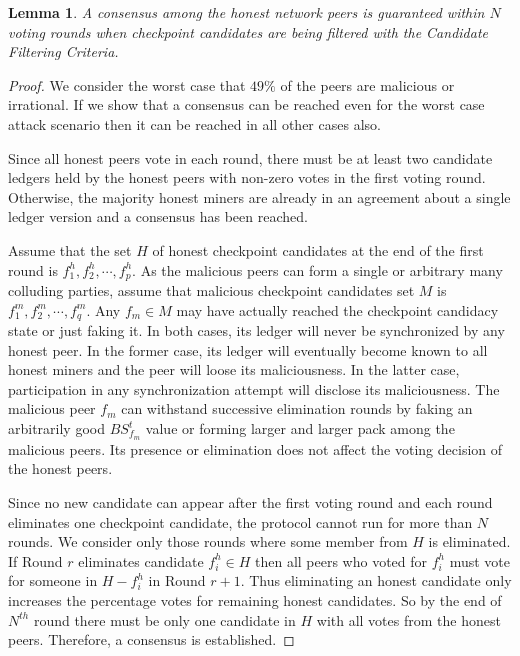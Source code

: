 \documentclass[conference]{IEEEtran}
\newtheorem{lemma}[theorem]{Lemma}
\begin{document}
\begin{lemma}
\label{l-consensus}
A consensus among the honest network peers is guaranteed within $N$ voting rounds when checkpoint candidates are being filtered with the Candidate Filtering Criteria. 
\end{lemma}  
\begin{proof}
We consider the worst case that $49\%$ of the peers are malicious or irrational. If we show that a consensus can be reached even for the worst case attack scenario then it can be reached in all other cases also.

Since all honest peers vote in each round, there must be at least two candidate ledgers held by the honest peers with non-zero votes in the first voting round. Otherwise, the majority honest miners are already in an agreement about a single ledger version and a consensus has been reached. 

Assume that the set $H$ of honest checkpoint candidates at the end of the first round is ${f_1^h, f_2^h, \cdots, f_p^h}$. As the malicious peers can form a single or arbitrary many colluding parties, assume that malicious checkpoint candidates set $M$ is ${f_1^m, f_2^m, \cdots, f_q^m}$. Any $f_m \in M$ may have actually reached the checkpoint candidacy state or just faking it. In both cases, its ledger will never be synchronized by any honest peer. In the former case, its ledger will eventually become known to all honest miners and the peer will loose its maliciousness. In the latter case, participation in any synchronization attempt will disclose its maliciousness. The malicious peer $f_m$ can withstand successive elimination rounds by faking an arbitrarily good $BS_{f_m}^t$ value or forming larger and larger pack among the malicious peers. Its presence or elimination does not affect the voting decision of the honest peers. 

Since no new candidate can appear after the first voting round and each round eliminates one checkpoint candidate, the protocol cannot run for more than $N$ rounds. We consider only those rounds where some member from $H$ is eliminated. If Round $r$ eliminates candidate $f_i^h \in H$ then all peers who voted for $f_i^h$ must vote for someone in $H - {f_i^h}$ in Round $r + 1$. Thus eliminating an honest candidate only increases the percentage votes for remaining honest candidates. So by the end of $N^{th}$ round there must be only one candidate in $H$ with all votes from the honest peers. Therefore, a consensus is established.                
\end{proof}
\end{document}
